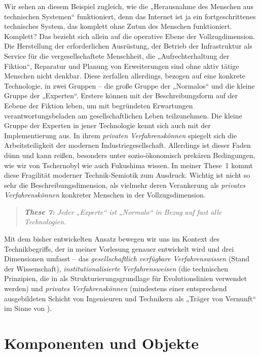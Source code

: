\documentclass[11pt,a4paper]{article}
\begin{document}
Wir sehen an diesem Beispiel zugleich, wie die „Herausnahme des Menschen aus
technischen Systemen“ funktioniert, denn das Internet ist ja ein
fortgeschrittenes technisches System, das komplett ohne Zutun des Menschen
funktioniert. Komplett?  Das bezieht sich allein auf die operative Ebene der
Vollzugdimension. Die Herstellung der erforderlichen Ausrüstung, der Betrieb
der Infrastruktur als Service für die vergesellschaftete Menschheit, die
„Aufrechterhaltung der Fiktion“, Reparatur und Planung von Erweiterungen sind
ohne aktiv tätige Menschen nicht denkbar. Diese zerfallen allerdings, bezogen
auf eine konkrete Technologie, in zwei Gruppen -- die große Gruppe der
„Normalos“ und die kleine Gruppe der „Experten“. Erstere können mit der
Beschreibungsform auf der Eebene der Fiktion leben, um mit begründeten
Erwartungen verantwortungsbeladen am gesellschaftlichen Leben teilzunehmen.
Die kleine Gruppe der Experten in jener Technologie kennt sich auch mit der
Implementierung aus. In ihrem \emph{privaten Verfahrenskönnen} spiegelt sich
die Arbeitsteiligkeit der modernen Industriegesellschaft.  Allerdings ist
dieser Faden dünn und kann reißen, besonders unter sozio-ökonomisch prekären
Bedingungen, wie wir von Tschernobyl wie auch Fukushima wissen. In meiner
These~1 kommt diese Fragilität moderner Technik-Semiotik zum Ausdruck. Wichtig
ist nicht so sehr die Beschreibungsdimension, als vielmehr deren Verankerung
als \emph{privates Verfahrenskönnen} konkreter Menschen in der
Vollzugsdimension.
\begin{quote}\it
  \textbf{These 7:} Jeder „Experte“ ist „Normalo“ in Bezug auf fast alle
  Technologien. 
\end{quote}
Mit dem bisher entwickelten Ansatz bewegen wir uns im Kontext des
Technikbegriffs, der in meiner Vorlesung genauer entwickelt wird und drei
Dimensionen umfasst -- das \emph{gesellschaftlich verfügbare Verfahrenswissen}
(Stand der Wissenschaft), \emph{institutionalisierte Verfahrensweisen} (die
technischen Prinzipien, die in \cite{Shpakovsky2010} als
Strukturierungsgrundlage für Evolutionslinien verwendet werden) und
\emph{privates Verfahrenskönnen} (mindestens einer entsprechend ausgebildeten
Schicht von Ingenieuren und Technikern als „Träger von Vernunft“ im Sinne von
\cite{Vernadsky2001}).

\section{Komponenten und Objekte}
\end{document}
